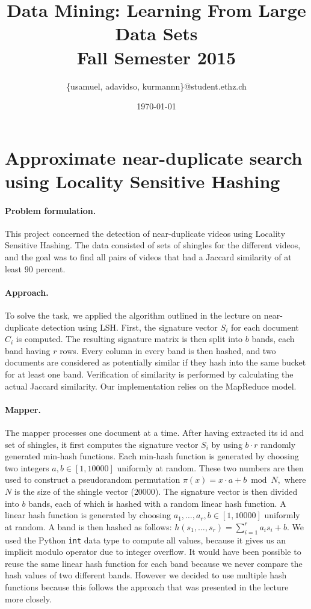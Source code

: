 \documentclass[a4paper,11pt]{article}
\title{Data Mining: Learning From Large Data Sets\\\vspace{2mm}\Large{Fall Semester 2015}}
\author{\{usamuel, adavidso, kurmannn\}@student.ethz.ch}
\date{\today}
\begin{document}
\maketitle
\thispagestyle{empty}
\pagestyle{empty}

\section{Approximate near-duplicate search using Locality Sensitive Hashing}

\paragraph{Problem formulation.\!\!\!}
This project concerned the detection of near-duplicate videos using Locality Sensitive Hashing. The data consisted of sets of shingles for the different videos, and the goal was to find all pairs of videos that had a Jaccard similarity of at least $90$ percent.

\paragraph{Approach.\!\!\!}
To solve the task, we applied the algorithm outlined in the lecture on near-duplicate detection using LSH. First, the signature vector $S_i$ for each document $C_i$ is computed. The resulting signature matrix is then split into $b$ bands, each band having $r$ rows. 
Every column in every band is then hashed, and two documents are considered as potentially similar if they hash into the same bucket for at least one band. Verification of similarity is performed by calculating the actual Jaccard similarity. Our implementation relies on the MapReduce model.

\paragraph{Mapper.\!\!\!}
The mapper processes one document at a time. After having extracted its id and set of shingles, it first computes the signature vector $S_i$ by using $b\cdot r$ randomly generated min-hash functions. Each min-hash function is generated by choosing two integers $a, b \in [1,10000]$ uniformly at random. These two numbers are then used to construct a pseudorandom permutation $\pi(x) = x \cdot a + b\ \operatorname{mod}\ N,$ where $N$ is the size of the shingle vector ($20000$). 
The signature vector is then divided into $b$ bands, each of which is hashed with a random linear hash function. 
A linear hash function is generated by choosing 
$a_1,\dots,a_r,b \in [1,10000]$ uniformly at random. A band is then hashed as follows: $h(s_1,\dots, s_r) = \sum_{i=1}^r a_i s_i + b$.
We used the Python \texttt{int} data type to compute all values, because it gives us an implicit modulo operator due to integer overflow. 
It would have been possible to reuse the same linear hash function for each band because we never compare the hash values of two different bands. 
However we decided to use multiple hash functions because this follows the approach that was presented in the lecture more closely.
\end{document}

